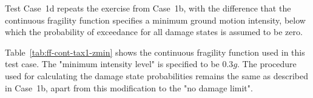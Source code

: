 Test Case~1d repeats the exercise from Case~1b, with the difference that the continuous fragility function specifies a minimum ground motion intensity, below which the probability of exceedance for all damage states is assumed to be zero.

Table~\ref{tab:ff-cont-tax1-zmin} shows the continuous fragility function used in this test case. The "minimum intensity level" is specified to be $0.3 g$. The procedure used for calculating the damage state probabilities remains the same as described in Case~1b, apart from this modification to the "no damage limit".